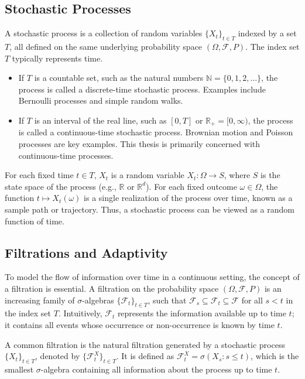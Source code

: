 \documentclass[11pt,twoside,openright]{report}
\begin{document}
\subsection{Stochastic Processes}
\label{subsec:stoch_proc}

A stochastic process is a collection of random variables $\{X_t\}_{t \in T}$ indexed by a set $T$, all defined on the same underlying probability space $(\Omega, \mathcal{F}, P)$. The index set $T$ typically represents time.
\begin{itemize}
    \item If $T$ is a countable set, such as the natural numbers $\mathbb{N} = \{0, 1, 2, \dots\}$, the process is called a discrete-time stochastic process. Examples include Bernoulli processes and simple random walks.
    \item If $T$ is an interval of the real line, such as $[0, T]$ or $\mathbb{R}_+ = [0, \infty)$, the process is called a continuous-time stochastic process. Brownian motion and Poisson processes are key examples. This thesis is primarily concerned with continuous-time processes.
\end{itemize}
For each fixed time $t \in T$, $X_t$ is a random variable $X_t: \Omega \to S$, where $S$ is the state space of the process (e.g., $\mathbb{R}$ or $\mathbb{R}^d$). For each fixed outcome $\omega \in \Omega$, the function $t \mapsto X_t(\omega)$ is a single realization of the process over time, known as a sample path or trajectory. Thus, a stochastic process can be viewed as a random function of time.

\subsection{Filtrations and Adaptivity}
\label{subsec:filtrations}

To model the flow of information over time in a continuous setting, the concept of a filtration is essential. A filtration on the probability space $(\Omega, \mathcal{F}, P)$ is an increasing family of $\sigma$-algebras $\{\mathcal{F}_t\}_{t \in T}$, such that $\mathcal{F}_s \subseteq \mathcal{F}_t \subseteq \mathcal{F}$ for all $s < t$ in the index set $T$. Intuitively, $\mathcal{F}_t$ represents the information available up to time $t$; it contains all events whose occurrence or non-occurrence is known by time $t$.

A common filtration is the natural filtration generated by a stochastic process $\{X_t\}_{t \in T}$, denoted by $\{\mathcal{F}_t^X\}_{t \in T}$. It is defined as $\mathcal{F}_t^X = \sigma(X_s : s \le t)$, which is the smallest $\sigma$-algebra containing all information about the process up to time $t$.
\end{document}
